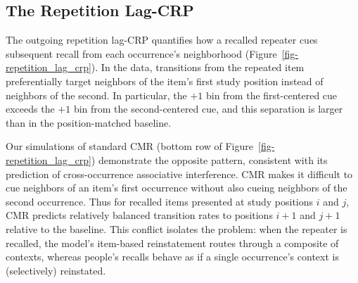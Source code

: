 \documentclass[
  man,
  floatsintext,
  longtable,
  nolmodern,
  notxfonts,
  notimes,
  draftfirst,
  colorlinks=true,linkcolor=blue,citecolor=blue,urlcolor=blue]{apa7}
\begin{document}
\subsection{The Repetition Lag-CRP}\label{the-repetition-lag-crp}

The outgoing repetition lag-CRP quantifies how a recalled repeater cues
subsequent recall from each occurrence's neighborhood
(Figure~\ref{fig-repetition_lag_crp}). In the data, transitions from the
repeated item preferentially target neighbors of the item's first study
position instead of neighbors of the second. In particular, the \(+1\)
bin from the first-centered cue exceeds the \(+1\) bin from the
second-centered cue, and this separation is larger than in the
position-matched baseline.

Our simulations of standard CMR (bottom row of
Figure~\ref{fig-repetition_lag_crp}) demonstrate the opposite pattern,
consistent with its prediction of cross-occurrence associative
interference. CMR makes it difficult to cue neighbors of an item's first
occurrence without also cueing neighbors of the second occurrence. Thus
for recalled items presented at study positions \(i\) and \(j\), CMR
predicts relatively balanced transition rates to positions \(i{+}1\) and
\(j{+}1\) relative to the baseline. This conflict isolates the problem:
when the repeater is recalled, the model's item-based reinstatement
routes through a composite of contexts, whereas people's recalls behave
as if a single occurrence's context is (selectively) reinstated.
\end{document}
